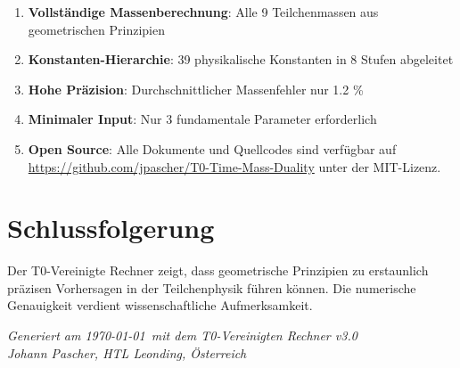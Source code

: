 \documentclass[11pt,a4paper]{article}
\begin{document}
\begin{enumerate}
\item \textbf{Vollständige Massenberechnung}: Alle 9 Teilchenmassen aus geometrischen Prinzipien
\item \textbf{Konstanten-Hierarchie}: 39 physikalische Konstanten in 8 Stufen abgeleitet
\item \textbf{Hohe Präzision}: Durchschnittlicher Massenfehler nur 1.2 \%
\item \textbf{Minimaler Input}: Nur 3 fundamentale Parameter erforderlich
\item \textbf{Open Source}: Alle Dokumente und Quellcodes sind verfügbar auf \url{https://github.com/jpascher/T0-Time-Mass-Duality} unter der MIT-Lizenz.
\end{enumerate}


\section{Schlussfolgerung}

Der T0-Vereinigte Rechner zeigt, dass geometrische Prinzipien zu erstaunlich präzisen Vorhersagen in der Teilchenphysik führen können. Die numerische Genauigkeit verdient wissenschaftliche Aufmerksamkeit.

\vfill
\begin{center}
\textit{Generiert am \today\ mit dem T0-Vereinigten Rechner v3.0}\\
\textit{Johann Pascher, HTL Leonding, Österreich}
\end{center}
\end{document}
